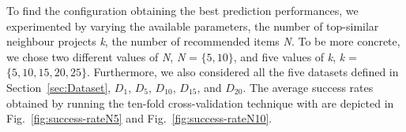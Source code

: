 To find the configuration obtaining the best prediction performances, we experimented %
by varying the available parameters, \ie the number of 
top-similar neighbour projects \emph{k}, the number of 
recommended items \emph{N}. %
To be more concrete, we chose two different values of \emph{N}, \ie \emph{N} = $\{5, 10\}$, and five values of \emph{k}, \ie \emph{k} = $\{5, 10, 15, 20, 25\}$. Furthermore, we also considered all the five datasets defined in Section~\ref{sec:Dataset}, \ie $D_{1}$, $D_{5}$, $D_{10}$, $D_{15}$, and $D_{20}$. The average success rates obtained by running the ten-fold cross-validation technique with \TFa are depicted in Fig.~\ref{fig:success-rateN5} and Fig.~\ref{fig:success-rateN10}.



